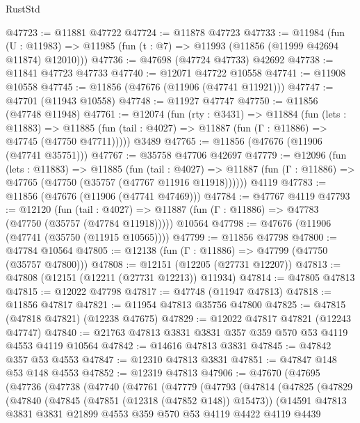\begin{lexlean}{RustStd}
\begin{coremodule}
@47723 := @11881 @47722
@47724 := @11878 @47723
@47733 := @11984
    (fun (U : @11983) => @11985 (fun (t : @7) => @11993 (@11856 (@11999 @42694 @11874) @12010)))
@47736 := @47698 (@47724 @47733) @42692
@47738 := @11841 @47723 @47733
@47740 := @12071 @47722 @10558
@47741 := @11908 @10558
@47745 := @11856 (@47676 (@11906 (@47741 @11921)))
@47747 := @47701 (@11943 @10558)
@47748 := @11927 @47747
@47750 := @11856 (@47748 @11948)
@47761 := @12074
    (fun (rty : @3431) =>
    @11884
      (fun (lets : @11883) =>
      @11885 (fun (tail : @4027) => @11887 (fun (Γ : @11886) => @47745 (@47750 @47711)))))
    @3489
@47765 := @11856 (@47676 (@11906 (@47741 @35751)))
@47767 := @35758 @47706 @42697
@47779 := @12096
    (fun (lets : @11883) =>
    @11885
      (fun (tail : @4027) =>
      @11887 (fun (Γ : @11886) => @47765 (@47750 (@35757 (@47767 @11916 @11918))))))
    @4119
@47783 := @11856 (@47676 (@11906 (@47741 @47469)))
@47784 := @47767 @4119
@47793 := @12120
    (fun (tail : @4027) => @11887 (fun (Γ : @11886) => @47783 (@47750 (@35757 (@47784 @11918)))))
    @10564
@47798 := @47676 (@11906 (@47741 (@35750 (@11915 @10565))))
@47799 := @11856 @47798
@47800 := @47784 @10564
@47805 := @12138 (fun (Γ : @11886) => @47799 (@47750 (@35757 @47800)))
@47808 := @12151 (@12205 (@27731 @12207))
@47813 := @47808 (@12151 (@12211 (@27731 @12213)) @11934)
@47814 := @47805 @47813
@47815 := @12022 @47798
@47817 := @47748 (@11947 @47813)
@47818 := @11856 @47817
@47821 := @11954 @47813 @35756 @47800
@47825 := @47815 (@47818 @47821) (@12238 @47675)
@47829 := @12022 @47817 @47821 (@12243 @47747)
@47840 := @21763 @47813 @3831 @3831 @357 @359 @570 @53 @4119 @4553 @4119 @10564
@47842 := @14616 @47813 @3831
@47845 := @47842 @357 @53 @4553
@47847 := @12310 @47813 @3831
@47851 := @47847 @148 @53 @148 @4553
@47852 := @12319 @47813
@47906 := @47670
    (@47695
      (@47736
        (@47738
          (@47740
            (@47761
              (@47779
                (@47793
                  (@47814
                    (@47825
                      (@47829
                        (@47840
                          (@47845 (@47851 (@12318 (@47852 @148)) @15473))
                          (@14591
                            @47813
                            @3831
                            @3831
                            @21899
                            @4553
                            @359
                            @570
                            @53
                            @4119
                            @4422
                            @4119
                            @4439

\end{coremodule}
\end{lexlean}
